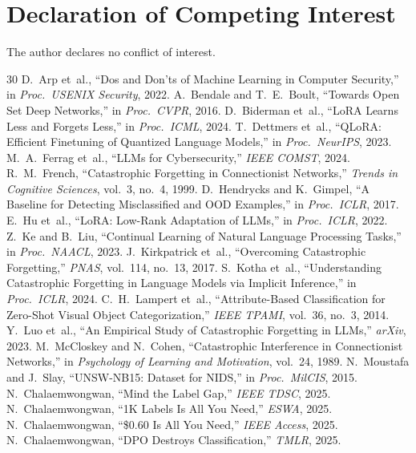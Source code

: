 \documentclass[journal]{IEEEtran}
\begin{document}
\section*{Declaration of Competing Interest}
The author declares no conflict of interest.

\begin{thebibliography}{30}
 D.~Arp et~al., ``Dos and Don'ts of Machine Learning in Computer Security,'' in \emph{Proc.\ USENIX Security}, 2022.
 A.~Bendale and T.~E.~Boult, ``Towards Open Set Deep Networks,'' in \emph{Proc.\ CVPR}, 2016.
 D.~Biderman et~al., ``LoRA Learns Less and Forgets Less,'' in \emph{Proc.\ ICML}, 2024.
 T.~Dettmers et~al., ``QLoRA: Efficient Finetuning of Quantized Language Models,'' in \emph{Proc.\ NeurIPS}, 2023.
 M.~A.~Ferrag et~al., ``LLMs for Cybersecurity,'' \emph{IEEE COMST}, 2024.
 R.~M.~French, ``Catastrophic Forgetting in Connectionist Networks,'' \emph{Trends in Cognitive Sciences}, vol.~3, no.~4, 1999.
 D.~Hendrycks and K.~Gimpel, ``A Baseline for Detecting Misclassified and OOD Examples,'' in \emph{Proc.\ ICLR}, 2017.
 E.~Hu et~al., ``LoRA: Low-Rank Adaptation of LLMs,'' in \emph{Proc.\ ICLR}, 2022.
 Z.~Ke and B.~Liu, ``Continual Learning of Natural Language Processing Tasks,'' in \emph{Proc.\ NAACL}, 2023.
 J.~Kirkpatrick et~al., ``Overcoming Catastrophic Forgetting,'' \emph{PNAS}, vol.~114, no.~13, 2017.
 S.~Kotha et~al., ``Understanding Catastrophic Forgetting in Language Models via Implicit Inference,'' in \emph{Proc.\ ICLR}, 2024.
 C.~H.~Lampert et~al., ``Attribute-Based Classification for Zero-Shot Visual Object Categorization,'' \emph{IEEE TPAMI}, vol.~36, no.~3, 2014.
 Y.~Luo et~al., ``An Empirical Study of Catastrophic Forgetting in LLMs,'' \emph{arXiv}, 2023.
 M.~McCloskey and N.~Cohen, ``Catastrophic Interference in Connectionist Networks,'' in \emph{Psychology of Learning and Motivation}, vol.~24, 1989.
 N.~Moustafa and J.~Slay, ``UNSW-NB15: Dataset for NIDS,'' in \emph{Proc.\ MilCIS}, 2015.
 N.~Chalaemwongwan, ``Mind the Label Gap,'' \emph{IEEE TDSC}, 2025.
 N.~Chalaemwongwan, ``1K Labels Is All You Need,'' \emph{ESWA}, 2025.
 N.~Chalaemwongwan, ``\$0.60 Is All You Need,'' \emph{IEEE Access}, 2025.
 N.~Chalaemwongwan, ``DPO Destroys Classification,'' \emph{TMLR}, 2025.

\end{thebibliography}
\end{document}
